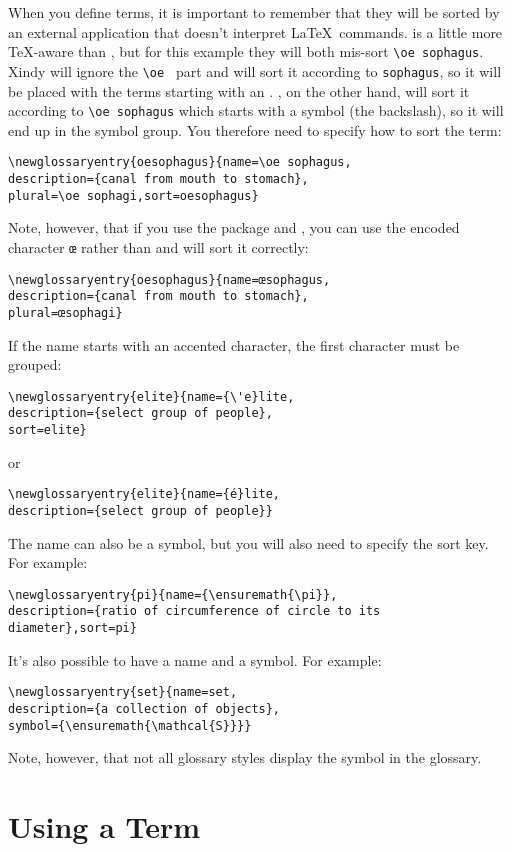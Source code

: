 \documentclass{nlctdoc}
\begin{document}
When you define terms, it is important to remember that they will
be sorted by an external application that doesn't interpret \LaTeX\
commands.  is a little more \TeX-aware than , but
for this example they will both mis-sort \verb|\oe sophagus|.
Xindy will ignore the \verb*|\oe | part and will sort it according
to \texttt{sophagus}, so it will be placed with the terms starting
with an \qt{s}. \app{Makeindex}, on the other hand, will sort it according
to \verb*|\oe sophagus| which starts with a symbol (the backslash),
so it will end up in the symbol group. You therefore need to 
specify how to sort the term:
\begin{verbatim}
\newglossaryentry{oesophagus}{name=\oe sophagus,
description={canal from mouth to stomach},
plural=\oe sophagi,sort=oesophagus}
\end{verbatim}
Note, however, that if you use the  package and
, you can use the encoded character \texttt{œ} rather than
\cs{oe} and \app{xindy} will sort it correctly:
\begin{verbatim}
\newglossaryentry{oesophagus}{name=œsophagus,
description={canal from mouth to stomach},
plural=œsophagi}
\end{verbatim}

If the name starts with an accented character, the first character
must be grouped:
\begin{verbatim}
\newglossaryentry{elite}{name={\'e}lite,
description={select group of people},
sort=elite}
\end{verbatim}
or
\begin{verbatim}
\newglossaryentry{elite}{name={é}lite,
description={select group of people}}
\end{verbatim}

The name can also be a symbol, but you will also need to specify
the sort key. For example:
\begin{verbatim}
\newglossaryentry{pi}{name={\ensuremath{\pi}},
description={ratio of circumference of circle to its 
diameter},sort=pi}
\end{verbatim}
It's also possible to have a name and a symbol. For example:
\begin{verbatim}
\newglossaryentry{set}{name=set,
description={a collection of objects},
symbol={\ensuremath{\mathcal{S}}}}
\end{verbatim}
Note, however, that not all glossary styles display the symbol
in the glossary.

\section{Using a Term}
\label{usingterm}
\end{document}
